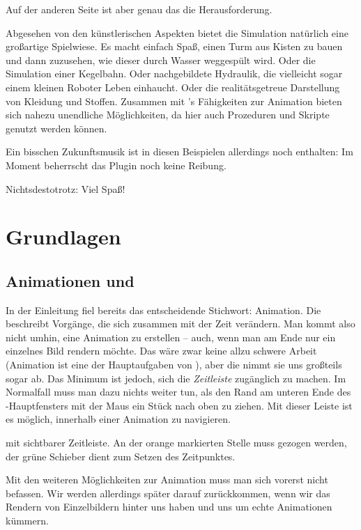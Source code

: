 \documentclass[10pt,DIV=14,a4paper]{scrartcl}
\begin{document}
Auf der anderen Seite ist aber genau das die Herausforderung.

Abgesehen von den künstlerischen Aspekten bietet die Simulation
natürlich eine großartige Spielwiese. Es macht einfach Spaß, einen Turm
aus Kisten zu bauen und dann zuzusehen, wie dieser durch Wasser
weggespült wird. Oder die Simulation einer Kegelbahn. Oder nachgebildete
Hydraulik, die vielleicht sogar einem kleinen Roboter Leben einhaucht.
Oder die realitätsgetreue Darstellung von Kleidung und Stoffen.
Zusammen mit \aoi's Fähigkeiten zur Animation bieten sich nahezu
unendliche Möglichkeiten, da hier auch Prozeduren und Skripte genutzt
werden können.

Ein bisschen Zukunftsmusik ist in diesen Beispielen allerdings noch
enthalten: Im Moment beherrscht das Plugin noch keine Reibung.

Nichtsdestotrotz: Viel Spaß!



\pagebreak
\section{Grundlagen}

\subsection{Animationen und }
In der Einleitung fiel bereits das entscheidende Stichwort: Animation.
Die \fluidsim beschreibt Vorgänge, die sich zusammen mit der Zeit
verändern. Man kommt also nicht umhin, eine Animation zu erstellen --
auch, wenn man am Ende nur ein einzelnes Bild rendern möchte. Das wäre
zwar keine allzu schwere Arbeit (Animation ist eine der Hauptaufgaben
von \aoi), aber die \fluidsim nimmt sie uns großteils sogar ab. Das
Minimum ist jedoch, sich die \emph{Zeitleiste} zugänglich zu machen. Im
Normalfall muss man dazu nichts weiter tun, als den Rand am unteren Ende
des \aoi-Hauptfensters mit der Maus ein Stück nach oben zu ziehen. Mit
dieser Leiste ist es möglich, innerhalb einer Animation zu navigieren.

{\aoi mit sichtbarer Zeitleiste. An der orange markierten Stelle muss
gezogen werden, der grüne Schieber dient zum Setzen des Zeitpunktes.}

Mit den weiteren Möglichkeiten zur Animation muss man sich vorerst nicht
befassen. Wir werden allerdings später darauf zurückkommen, wenn wir das
Rendern von Einzelbildern hinter uns haben und uns um echte Animationen
kümmern.
\end{document}
